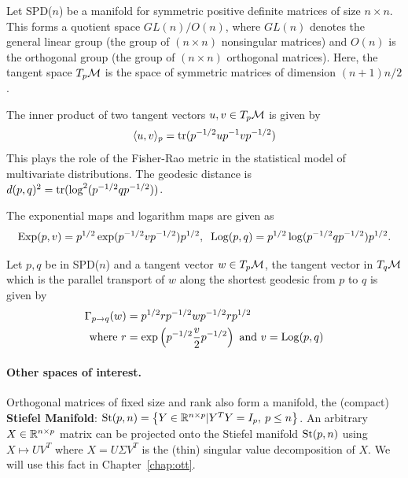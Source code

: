 Let SPD($n$) be a manifold for symmetric positive definite matrices of size $n\times n$.
This forms a quotient space $GL(n)/O(n)$, where
$GL(n)$ denotes the general linear group (the group of $(n \times n)$ nonsingular matrices)
and $O(n)$ is the orthogonal group 
(the group of $(n \times n)$ orthogonal matrices). 
Here, the tangent space $T_{p}\mathcal{M}$ is the space of symmetric matrices of dimension $(n+1)n/2$.

The inner product of two tangent vectors $u,v \in T_{p}\mathcal{M}$ is given by 
\begin{equation}
\begin{split}
  \langle u,v \rangle_{p} = \operatorname{tr}(p^{-1/2}up^{-1}vp^{-1/2})
\end{split}
\label{eq:metricSPD}
\end{equation}
This plays the role of the Fisher-Rao metric in the statistical model of multivariate distributions.
The geodesic distance is $d(p,q)^{2} = \operatorname{tr}( \log^{2}(p^{-1/2}qp^{-1/2}))$.

The exponential maps and logarithm maps are given as 
\begin{equation}
\begin{split}
  \operatorname*{Exp}(p,v) = p^{1/2} \exp(p^{-1/2}vp^{-1/2})p^{1/2}, \;\;
  \operatorname*{Log}(p,q) = p^{1/2} \log(p^{-1/2}qp^{-1/2})p^{1/2}.
\end{split}
\end{equation}

Let $p, q$ be in SPD($n$) and a tangent vector $w \in T_{p}\mathcal{M}$, the
tangent vector in $T_{q}\mathcal{M}$ which is the parallel transport of $w$ along
the shortest geodesic from $p$ to $q$ is given by 
\begin{equation}
\begin{split}
\Gamma_{p \rightarrow q}(w) &= p^{1/2}rp^{-1/2}wp^{-1/2}rp^{1/2} \\
\text{where } r &= \exp \left (p^{-1/2}\frac{v}{2}p^{-1/2} \right ) \text{ and
}v = \operatorname*{Log}(p,q)
\end{split}
\end{equation}

\paragraph{Other spaces of interest.}
Orthogonal matrices of fixed size and rank also form a manifold, the (compact) \textbf{Stiefel Manifold}: $ \text{St}(p,n)=\left\{Y \in \mathbb{R}^{n\times p} | Y^TY=I_p,\: p \leq n\right\}$.
An arbitrary $X \in \mathbb{R}^{n \times p}$ matrix can be projected onto the Stiefel manifold $\text{St}(p,n)$ using $X \mapsto UV^T$ where $X=U\Sigma V^T$ is the (thin) singular value decomposition of $X$. We will use this fact in Chapter~\ref{chap:ott}.
